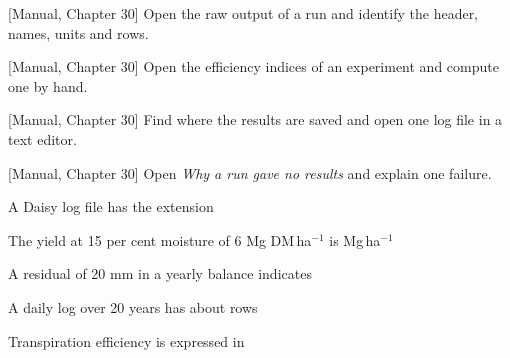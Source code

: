 \begin{exlist}
\item {\color{khblue}[Manual, Chapter 30]} Open the raw output of a run and identify the header, names, units and rows.\par{}
\item {\color{khblue}[Manual, Chapter 30]} Open the efficiency indices of an experiment and compute one by hand.\par{}
\item {\color{khblue}[Manual, Chapter 30]} Find where the results are saved and open one log file in a text editor.\par{}
\item {\color{khblue}[Manual, Chapter 30]} Open \emph{Why a run gave no results} and explain one failure.\par{}
\end{exlist}
\begin{exlist}
\item A Daisy log file has the extension
\item The yield at 15 per cent moisture of 6 Mg DM\,ha$^{-1}$ is Mg\,ha$^{-1}$
\item A residual of 20 mm in a yearly balance indicates
\item A daily log over 20 years has about rows
\item Transpiration efficiency is expressed in
\end{exlist}
